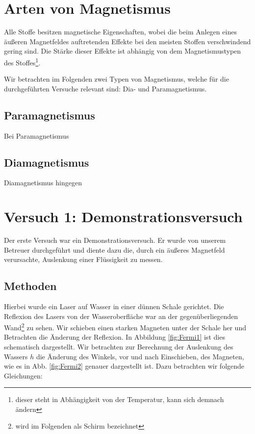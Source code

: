 \documentclass[11pt,a4paper,titlepage, ngerman]{article}
\begin{document}
	\section{Arten von Magnetismus}
				
		Alle Stoffe besitzen magnetische Eigenschaften, wobei die beim Anlegen eines äußeren Magnetfeldes auftretenden Effekte bei den meisten Stoffen verschwindend gering sind. Die \glqq Stärke \grqq dieser Effekte ist abhängig von dem Magnetismustypen des Stoffes\footnote{dieser steht in Abhängigkeit von der Temperatur, kann sich demnach ändern}. 
				
		Wir betrachten im Folgenden zwei Typen von Magnetismus, welche für die durchgeführten Versuche relevant sind: Dia- und Paramagnetismus.
		
		\subsection{Paramagnetismus}
			
			Bei Paramagnetismus %
			
			
		\subsection{Diamagnetismus}
		
			Diamagnetismus hingegen %
			
			
	\section{Versuch 1: Demonstrationsversuch} 
		
		Der erste Versuch war ein Demonstrationsversuch. Er wurde von unserem Betreuer durchgeführt und diente dazu die, durch ein äußeres Magnetfeld verursachte, Auslenkung einer Flüssigkeit zu messen.
		
		\subsection*{Methoden} 
		
		Hierbei wurde ein Laser auf Wasser in einer dünnen Schale gerichtet. Die Reflexion des Lasers von der Wasseroberfläche war an der gegenüberliegenden Wand\footnote{wird im Folgenden als Schirm bezeichnet} zu sehen. Wir schieben einen starken Magneten unter der Schale her und Betrachten die Änderung der Reflexion.
		In Abbildung \ref{fig:Fermi1} ist dies schematisch dargestellt. Wir betrachten zur Berechnung der Auslenkung des Wassers $h$ die Änderung des Winkels, vor und nach Einschieben, des Magneten, wie es in Abb. \ref{fig:Fermi2} genauer dargestellt ist. Dazu betrachten wir folgende Gleichungen:
		
\end{document}
